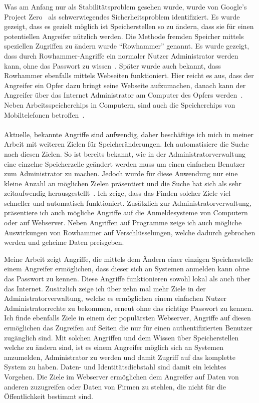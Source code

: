 \documentclass[a4paper]{article}
\begin{document}
Was am Anfang nur als Stabilitätsproblem gesehen wurde, wurde von Google's
Project Zero~\cite{projectzerorow} als schwerwiegendes Sicherheitsproblem
identifiziert. Es wurde gezeigt, dass es gezielt möglich ist Speicherstellen so
zu ändern, dass sie für einen potentiellen Angreifer nützlich werden. Die
Methode fremden Speicher mittels speziellen Zugriffen zu ändern wurde
``Rowhammer'' genannt. Es wurde gezeigt, dass durch Rowhammer-Angriffe ein
normaler Nutzer Administrator werden kann, ohne das Passwort zu
wissen~\cite{projectzerorow}. Später wurde auch bekannt, dass Rowhammer
ebenfalls mittels Webseiten funktioniert. Hier reicht es aus, dass der Angreifer
ein Opfer dazu bringt seine Webseite aufzumachen, danach kann der Angreifer
über das Internet Administrator am Computer des Opfers
werden~\cite{rowhammerjs}. Neben Arbeitsspeicherchips in Computern, sind auch
die Speicherchips von Mobiltelefonen betroffen~\cite{drammer}.

\paragraph{}

Aktuelle, bekannte Angriffe sind aufwendig, daher beschäftige ich mich in
meiner Arbeit mit weiteren Zielen für Speicheränderungen. Ich automatisiere die
Suche nach diesen Zielen. So ist bereits bekannt, wie in der
Administratorverwaltung eine einzelne Speicherzelle geändert werden muss um
einen einfachen Benutzer zum Administrator zu machen. Jedoch wurde für diese
Anwendung nur eine kleine Anzahl an möglichen Zielen
präsentiert und die Suche hat sich als sehr zeitaufwendig
herausgestellt~\cite{flipinthewall}. Ich zeige, dass das Finden solcher Ziele
viel schneller und automatisch funktioniert. Zusätzlich zur
Administratorverwaltung, präsentiere ich auch mögliche Angriffe auf die
Anmeldesysteme von Computern oder auf Webserver. Neben Angriffen auf Programme
zeige ich auch mögliche Auswirkungen von Rowhammer auf Verschlüsselungen, welche
dadurch gebrochen werden und geheime Daten preisgeben.

Meine Arbeit zeigt Angriffe, die mittels dem Ändern einer einzigen
Speicherstelle einem Angreifer ermöglichen, dass dieser sich an Systemen
anmelden kann ohne das Passwort zu kennen. Diese Angriffe funktionieren sowohl
lokal als auch über das Internet. Zusätzlich zeige ich über zehn mal mehr Ziele
in der Administratorverwaltung, welche es ermöglichen einem einfachen Nutzer
Administratorrechte zu bekommen, erneut ohne das richtige Passwort zu kennen.
Ich finde ebenfalls Ziele in einem der populärsten Webserver, Angriffe auf
diesen ermöglichen das Zugreifen auf Seiten die nur für einen authentifizierten
Benutzer zugänglich sind. Mit solchen Angriffen und dem Wissen über
Speicherstellen welche zu ändern sind, ist es einem Angreifer möglich sich an
Systemen anzumelden, Administrator zu werden und damit Zugriff auf das komplette
System zu haben. Daten- und Identitätsdiebstahl sind damit ein leichtes
Vorgehen. Die Ziele im Webserver ermöglichen dem Angreifer auf Daten von anderen
zuzugreifen oder Daten von Firmen zu stehlen, die nicht für die Öffentlichkeit
bestimmt sind.
\end{document}
